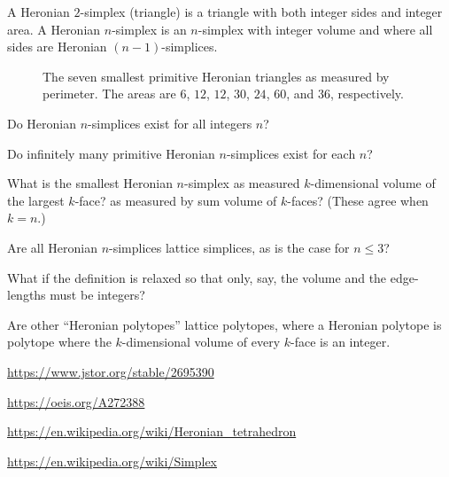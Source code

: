 \documentclass{article}
\begin{document}
A Heronian $2$-simplex (triangle) is a triangle with both integer sides and
integer area. A Heronian $n$-simplex is an $n$-simplex with integer volume and
where all sides are Heronian $(n - 1)$-simplices.
\begin{figure}[ht!]
  \centering
  \caption{
    The seven smallest primitive Heronian triangles as measured by perimeter.
    The areas are $6$, $12$, $12$, $30$, $24$, $60$, and $36$, respectively.
  }
\end{figure}
\begin{question}
  Do Heronian $n$-simplices exist for all integers $n$?
\end{question}

\begin{related}
  \item Do infinitely many primitive Heronian $n$-simplices exist for each $n$?
  \item What is the smallest Heronian $n$-simplex
    as measured $k$-dimensional volume of the largest $k$-face?
    as measured by sum volume of $k$-faces? (These agree when $k=n$.)
  \item Are all Heronian $n$-simplices lattice simplices, as is the case for
    $n \leq 3$?
  \item What if the definition is relaxed so that only, say, the volume and the
    edge-lengths must be integers?
  \item Are other ``Heronian polytopes'' lattice polytopes, where a
    Heronian polytope is polytope where the $k$-dimensional volume of every
    $k$-face is an integer.
\end{related}
\begin{references}
  \item \url{https://www.jstor.org/stable/2695390}
  \item \url{https://oeis.org/A272388}
  \item \url{https://en.wikipedia.org/wiki/Heronian_tetrahedron}
  \item \url{https://en.wikipedia.org/wiki/Simplex}
\end{references}
\end{document}
